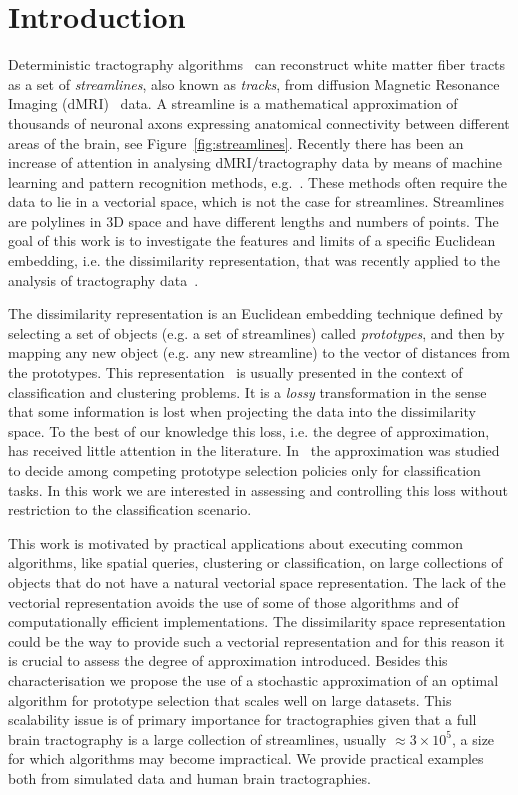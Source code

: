 \section{Introduction}
\label{sec:introduction}
Deterministic tractography algorithms~\cite{mori2002fiber} can
reconstruct white matter fiber tracts as a set of \emph{streamlines},
also known as \emph{tracks}, from diffusion Magnetic Resonance Imaging
(dMRI)~\cite{basser1994diffusion} data. A
streamline is a mathematical approximation of thousands of neuronal
axons expressing anatomical connectivity between different areas of
the brain, see Figure~\ref{fig:streamlines}. Recently there has been
an increase of attention in analysing dMRI/tractography data by means
of machine learning and pattern recognition methods,
e.g.~\cite{zhang2008identifying,wang2011tractography}. These methods often
require the data to lie in a vectorial space, which is not the case
for streamlines. Streamlines are polylines in $3$D space and have
different lengths and numbers of points. The goal of this work is to
investigate the features and limits of a specific Euclidean embedding,
i.e. the dissimilarity representation, that was recently applied to
the analysis of tractography data~\cite{olivetti2011supervised}.

The dissimilarity representation is an Euclidean embedding technique
defined by selecting a set of objects (e.g. a set of streamlines)
called \emph{prototypes}, and then by mapping any new object (e.g. any
new streamline) to the vector of distances from the prototypes. This
representation~\cite{pekalska2002generalized,balcan2008theory,chen2009similarity}
is usually presented in the context of classification and clustering
problems. It is a \emph{lossy} transformation in the sense that some
information is lost when projecting the data into the dissimilarity
space. To the best of our knowledge this loss, i.e. the degree of
approximation, has received little attention in the
literature. In~\cite{pekalska2006prototype} the approximation was
studied to decide among competing prototype selection policies only
for classification tasks. In this work we are interested in assessing
and controlling this loss without restriction to the classification
scenario.

This work is motivated by practical applications about executing
common algorithms, like spatial queries, clustering or classification,
on large collections of objects that do not have a natural vectorial
space representation. The lack of the vectorial representation avoids
the use of some of those algorithms and of computationally efficient
implementations. The dissimilarity space representation could be the
way to provide such a vectorial representation and for this reason it
is crucial to assess the degree of approximation introduced. Besides
this characterisation we propose the use of a stochastic approximation
of an optimal algorithm for prototype selection that scales well on
large datasets. This scalability issue is of primary importance for
tractographies given that a full brain tractography is a large
collection of streamlines, usually $\approx 3 \times 10^5$, a size for
which algorithms may become impractical. We provide practical
examples both from simulated data and human brain tractographies.


